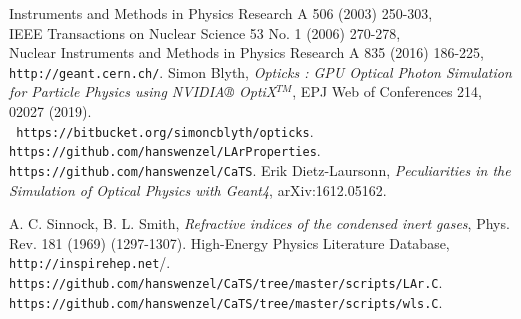 \documentclass{article}
\begin{document}
 \begin{thebibliography}{99}
      Instruments and Methods in Physics Research A 506 (2003) 250-303, \\
      IEEE Transactions on Nuclear Science 53 No. 1 (2006) 270-278, \\
      Nuclear Instruments and Methods in Physics Research A 835 (2016) 186-225,\\
      \verb|http://geant.cern.ch/|.
 Simon Blyth, {\it Opticks : GPU Optical Photon Simulation for Particle Physics using NVIDIA® OptiX$^{TM}$},
EPJ Web of Conferences 214, 02027 (2019).\\
  \verb| https://bitbucket.org/simoncblyth/opticks|.
   \verb|https://github.com/hanswenzel/LArProperties|.
   \verb|https://github.com/hanswenzel/CaTS|.
Erik Dietz-Laursonn, {\it Peculiarities in the Simulation of Optical Physics with Geant4},  	arXiv:1612.05162.

 A. C. Sinnock, B. L. Smith, {\it Refractive indices of the condensed inert gases}, Phys. Rev. 181 (1969) (1297-1307).
 High-Energy Physics Literature Database,
  \verb"http://inspirehep.net"/.
  \verb|https://github.com/hanswenzel/CaTS/tree/master/scripts/LAr.C|.\\
  \verb|https://github.com/hanswenzel/CaTS/tree/master/scripts/wls.C|.


\end{thebibliography}
\end{document}

